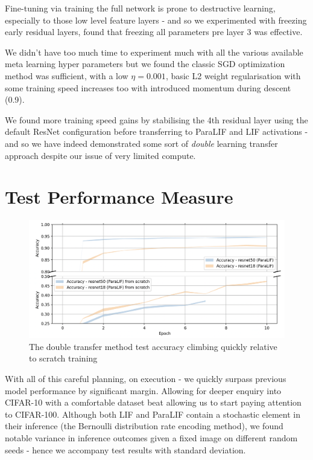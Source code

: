 \documentclass[conference]{IEEEtran}
\begin{document}
\pagebreak

Fine-tuning via training the full network is prone to destructive learning, especially to those low level feature layers - and so we experimented with freezing early residual layers, found that freezing all parameters pre layer 3 was effective.

We didn't have too much time to experiment much with all the various available meta learning hyper parameters but we found the classic SGD optimization method was sufficient, with a low $\eta=0.001$, basic L2 weight regularisation with some training speed increases too with introduced momentum during descent (0.9).

We found more training speed gains by stabilising the 4th residual layer using the default ResNet configuration before transferring to ParaLIF and LIF activations - and so we have indeed demonstrated some sort of \emph{double} learning transfer approach despite our issue of very limited compute.

\section{Test Performance Measure}
\begin{figure}[h!]
    \centering
    \includegraphics[width=\linewidth]{transfer-contrast.png}
    \caption{The double transfer method test accuracy climbing quickly relative to scratch training}
    \label{fig:transfer_contrast}
\end{figure}

With all of this careful planning, on execution - we quickly surpass previous model performance by significant margin. Allowing for deeper enquiry into CIFAR-10 with a comfortable dataset beat allowing us to start paying attention to CIFAR-100. Although both LIF and ParaLIF contain a stochastic element in their inference (the Bernoulli distribution rate encoding method), we found notable variance in inference outcomes given a fixed image on different random seeds - hence we accompany test results with standard deviation.
\end{document}
